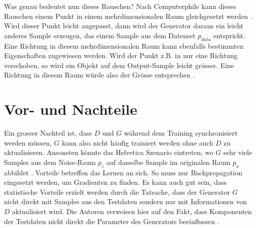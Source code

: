 \para
Was genau bedeutet nun dieses Rauschen? Nach \glqq Computerphile\grqq{} kann dieses Rauschen einem Punkt in einem
mehrdimensionalen Raum gleichgesetzt werden \cite[~t 16:45]{youtube:gan}. Wird dieser Punkt leicht angepasst, dann
wird der Generator daraus ein leicht anderes Sample erzeugen, das einem Sample aus dem Datenset $p_{data}$ entspricht.
Eine Richtung in diesem mehrdimensionalen Raum kann ebenfalls bestimmten Eigenschaften zugewiesen werden. Wird der Punkt
z.B. in nur eine Richtung verschoben, so wird ein Objekt auf dem Output-Sample leicht grösser. Eine
Richtung in diesem Raum würde also der Grösse entsprechen \cite[~t 17:35]{youtube:gan}.

\section{Vor- und Nachteile}
Ein grosser Nachteil ist, dass $D$ und $G$ während dem Training synchronisiert werden müssen, $G$ kann also nicht
häufig trainiert werden ohne auch $D$ zu aktualisieren. Ansonsten könnte das \glqq Helvetica Szenario\grqq{} eintreten,
wo $G$ sehr viele Samples aus dem Noise-Raum $p_z$ auf dasselbe Sample im originalen Raum $p_x$ abbildet \cite{8253599}.
\para
Vorteile betreffen das Lernen an sich. So muss nur \Gls{Backpropagation} eingesetzt werden, um Gradienten zu finden.
Es kann auch gut sein, dass statistische Vorteile erzielt werden durch die Tatsache, dass der Generator $G$ nicht direkt
mit Samples aus den Testdaten sondern nur mit Informationen von $D$ aktualisiert wird. Die Autoren verweisen hier auf
den Fakt, dass Komponenten der Testdaten nicht direkt die Parameter des Generators beeinflussen \cite{8253599}.